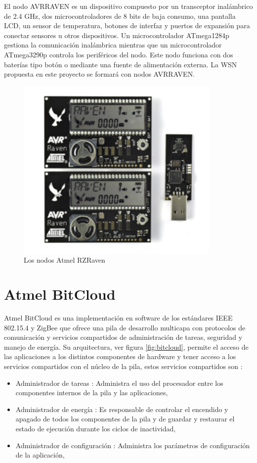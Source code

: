El nodo AVRRAVEN es un dispositivo compuesto por un transceptor inalámbrico de 2.4 GHz, dos microcontroladores de 8 bits de baja consumo, una pantalla LCD, un sensor de temperatura, botones de interfaz y puertos de expansión para conectar sensores u otros dispositivos. Un microcontrolador ATmega1284p gestiona la comunicación inalámbrica mientras que un microcontrolador ATmega3290p controla los periféricos del nodo. Este nodo funciona con dos baterías tipo botón o mediante una fuente de alimentación externa. La WSN propuesta en este proyecto se formará con nodos AVRRAVEN.

\begin{figure}
	\centering
	\includegraphics[scale=0.9]{capitulo_2_imgs/raven.pdf}
	\caption{Los nodos Atmel RZRaven}
	\label{fig:raven}
\end{figure}

\section{Atmel BitCloud}

Atmel BitCloud\cite{atmel:bitcloud} es una implementación en software de los estándares IEEE 802.15.4 y ZigBee que ofrece una pila de desarrollo multicapa con protocolos de comunicación y servicios compartidos de administración de tareas, seguridad y manejo de energía. Su arquitectura, ver figura \ref{fig:bitcloud}, permite el acceso de las aplicaciones a los distintos componentes de hardware y tener acceso a los servicios compartidos con el núcleo de la pila, estos servicios compartidos son : 

\begin{itemize}
	\item Administrador de tareas : Administra el uso del procesador entre los componentes internos de la pila y las aplicaciones,
	\item Administrador de energía : Es responsable de controlar el encendido y apagado de todos los componentes de la pila y de guardar y restaurar el estado de ejecución durante los ciclos de inactividad,  
	\item Administrador de configuración : Administra los parámetros de configuración de la aplicación,
\end{itemize}

